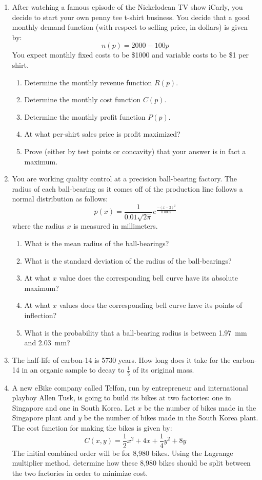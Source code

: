 \documentclass[letterpaper,12pt,fleqn]{article}
\begin{document}
\begin{enumerate}[left=0pt]
\item After watching a famous episode of the Nickelodean TV show iCarly, you decide to start your own penny tee t-shirt
  business.  You decide that a good monthly demand function (with respect to selling price, in dollars) is given by:
  \[n(p)=2000-100p\]
  You expect monthly fixed costs to be \$1000 and variable costs to be \$1 per shirt.
  \begin{enumerate}
  \item Determine the monthly revenue function \(R(p)\).
  \item Determine the monthly cost function \(C(p)\).
  \item Determine the monthly profit function \(P(p)\).
  \item At what per-shirt sales price is profit maximized?
  \item Prove (either by test points or concavity) that your answer is in fact a maximum.
  \end{enumerate}

\item You are working quality control at a precision ball-bearing factory.  The radius of each ball-bearing as it
  comes off of the production line follows a normal distribution as follows:
  \[p(x)=\frac{1}{0.01\sqrt{2\pi}}e^{\frac{-(x-2)^2}{0.0002}}\]
  where the radius \(x\) is measured in millimeters.
  \begin{enumerate}
  \item What is the mean radius of the ball-bearings?
  \item What is the standard deviation of the radius of the ball-bearings?
  \item At what \(x\) value does the corresponding bell curve have its absolute maximum?
  \item At what \(x\) values does the corresponding bell curve have its points of inflection?
  \item What is the probability that a ball-bearing radius is between \SI{1.97}{mm} and \SI{2.03}{mm}?
  \end{enumerate}

\item The half-life of carbon-14 is 5730 years.  How long does it take for the carbon-14 in an organic sample to
  decay to \(\frac{1}{5}\) of its original mass.

\item A new eBike company called Telfon, run by entrepreneur and international playboy Allen Tusk, is going to
  build its bikes at two factories: one in Singapore and one in South Korea.  Let \(x\) be the number of bikes made
  in the Singapore plant and \(y\) be the number of bikes made in the South Korea plant.  The cost function for
  making the bikes is given by:
  \[C(x,y)=\frac{1}{2}x^2+4x+\frac{1}{4}y^2+8y\]
  The initial combined order will be for 8,980 bikes.  Using the Lagrange multiplier method, determine how these
  8,980 bikes should be split between the two factories in order to minimize cost.


\end{enumerate}
\end{document}
